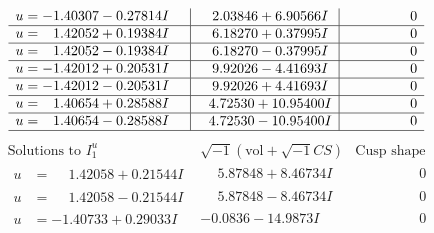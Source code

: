 \documentclass[1p]{elsarticle_modified}
\theoremstyle{definition}
\newcommand{\I}{\sqrt{-1}}
\begin{document}
$$\begin{array}{c|c|c}
\begin{aligned}
u &= -1.40307 - 0.27814 I\end{aligned}
 & \phantom{-}2.03846 + 6.90566 I & \phantom{-0.000000 } 0 \\ \hline\begin{aligned}
u &= \phantom{-}1.42052 + 0.19384 I\end{aligned}
 & \phantom{-}6.18270 + 0.37995 I & \phantom{-0.000000 } 0 \\ \hline\begin{aligned}
u &= \phantom{-}1.42052 - 0.19384 I\end{aligned}
 & \phantom{-}6.18270 - 0.37995 I & \phantom{-0.000000 } 0 \\ \hline\begin{aligned}
u &= -1.42012 + 0.20531 I\end{aligned}
 & \phantom{-}9.92026 - 4.41693 I & \phantom{-0.000000 } 0 \\ \hline\begin{aligned}
u &= -1.42012 - 0.20531 I\end{aligned}
 & \phantom{-}9.92026 + 4.41693 I & \phantom{-0.000000 } 0 \\ \hline\begin{aligned}
u &= \phantom{-}1.40654 + 0.28588 I\end{aligned}
 & \phantom{-}4.72530 + 10.95400 I & \phantom{-0.000000 } 0 \\ \hline\begin{aligned}
u &= \phantom{-}1.40654 - 0.28588 I\end{aligned}
 & \phantom{-}4.72530 - 10.95400 I & \phantom{-0.000000 } 0\\
 \hline 
 \end{array}$$\newpage$$\begin{array}{c|c|c}  
\text{Solutions to }I^u_{1}& \I (\text{vol} + \sqrt{-1}CS) & \text{Cusp shape}\\
 \hline 
\begin{aligned}
u &= \phantom{-}1.42058 + 0.21544 I\end{aligned}
 & \phantom{-}5.87848 + 8.46734 I & \phantom{-0.000000 } 0 \\ \hline\begin{aligned}
u &= \phantom{-}1.42058 - 0.21544 I\end{aligned}
 & \phantom{-}5.87848 - 8.46734 I & \phantom{-0.000000 } 0 \\ \hline\begin{aligned}
u &= -1.40733 + 0.29033 I\end{aligned}
 & -0.0836 - 14.9873 I & \phantom{-0.000000 } 0 \\ \hline\begin{aligned}

\end{aligned}
\end{array}$$
\end{document}
